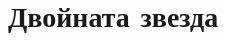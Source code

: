 % 
% 
%     
%     
%     
%     
%     
%     
%     
%     
%     
%     
\chapter{Двойната звезда}
\label{chap:double}
    
%     
\begin{appendices}
%     
%     
%     
%     
    
\end{appendices}
